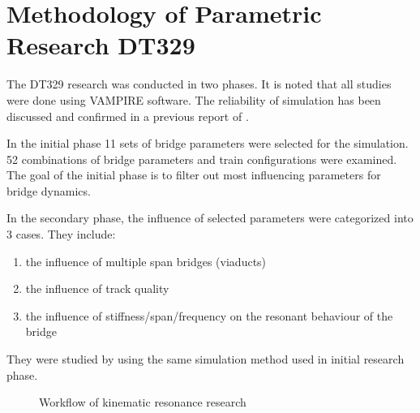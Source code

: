 \section{Methodology of Parametric Research DT329}

The DT329 research was conducted in two phases. It is noted that all studies were done using VAMPIRE software. The reliability of simulation has been discussed and confirmed in a previous report of \citet{d181rp2}.

In the initial phase 11 sets of bridge parameters were selected for the simulation. 52 combinations of bridge parameters and train configurations were examined. The goal of the initial phase is to filter out most influencing parameters for bridge dynamics.

In the secondary phase, the influence of selected parameters were categorized into 3 cases. They include:
\begin{enumerate}
 \item the influence of multiple span bridges (viaducts)
 \item the influence of track quality
 \item the influence of stiffness/span/frequency on the resonant behaviour of the bridge
\end{enumerate}
They were studied by using the same simulation method used in initial research phase.


\begin{figure}[h]
\centering
{}
\caption{Workflow of kinematic resonance research}
\label{fig:workflow329kinematic}
\end{figure}


